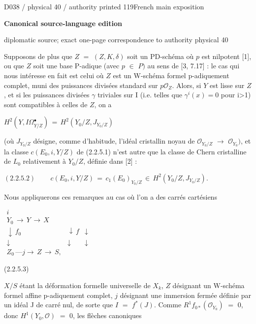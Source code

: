 \documentclass[9pt]{article}
\newcommand{\CanonText}[1]{\par{\fontsize{8.0}{9.35}\selectfont\RaggedRight #1\par}\vspace{2.2pt}}
\newcommand{\CanonDisplay}[1]{\par\vspace{1.2pt}\begin{center}{\fontsize{7.2}{8.4}\selectfont\(\displaystyle #1\)}\end{center}\vspace{1.2pt}}
\newenvironment{CanonMathBlock}{\par\vspace{1.2pt}\begin{center}\fontsize{6.8}{8.0}\selectfont\(\displaystyle}{\)\end{center}\vspace{1.2pt}}
\newcommand{\LayerTitle}{Canonical source-language edition}
\begin{document}
\noindent\begin{minipage}[t][\dimexpr\textheight-5pt\relax][t]{\textwidth}
{\sffamily\fontsize{7.3}{8.2}\selectfont\color{Quiet} D038 / physical 40 / authority printed 119\hfill French main exposition}
\par{}\vspace{4.5pt}
{\sffamily\fontsize{10.4}{11.6}\selectfont\bfseries\color{Accent} \LayerTitle}
\par{\sffamily\fontsize{6.7}{7.7}\selectfont\color{Quiet} diplomatic source; exact one-page correspondence to authority physical 40}
\vspace{5pt}
\CanonText{Supposons de plus que \(Z\) \(=\) \((Z,K,\delta{})\) soit un PD-schéma où \(p\) est nilpotent [1], ou que \(Z\) soit une base P-adique (avec \(p\) \(\in{}\) \(P)\) au sens de [3, 7.17] : le cas qui nous intéresse en fait est celui où \(Z\) est un W-schéma formel p-adiquement complet, muni des puissances divisées standard sur \(p\mathcal{O}_{Z}\). Alors, si \(Y\) est lisse sur \(Z\), et si les puissances divisées \(\gamma{}\) triviales sur I (i.e. telles que \(\gamma{}^{i}(x)=0\) pour i>1) sont compatibles à celles de \(Z\), on a}
\CanonDisplay{H^{2}(Y,I\Omega{}^{\bullet{}}_{Y/Z})\,=\,H^{2}(Y_{0}/Z,J_{Y_{0}/Z})}
\CanonText{(où \(J_{Y_{0}/Z}\) désigne, comme d'habitude, l'idéal cristallin noyau de \(\mathcal{O}_{Y_{0}/Z}\) \(\to{}\) \(\mathcal{O}_{Y_{0}})\), et la classe \(c(E_{0},i,Y/Z)\) de (2.2.5.1) n'est autre que la classe de Chern cristalline de \(L_{0}\) relativement à \(Y_{0}/Z\), définie dans [2] :}
\CanonDisplay{(2.2.5.2)\qquad\,c(E_{0},i,Y/Z)\,=\,c_{1}(E_{0})_{Y_{0}/Z}\,\in{}\,H^{2}(Y_{0}/Z,J_{Y_{0}/Z}).}
\CanonText{Nous appliquerons ces remarques au cas où l'on a des carrés cartésiens}
\begin{CanonMathBlock}
\begin{array}{ccc}
i & {} & {}\\
Y_{0}\,\longrightarrow{}\,Y\,\longrightarrow{}\,X & {} & {}\\
\downarrow{}\,f_{0} & \downarrow{}\,f & \downarrow{}\\
\downarrow{} & \downarrow{} & \downarrow{}\\
Z_{0}\,\text{---}j\longrightarrow{}\,Z\,\longrightarrow{}\,S, & {} & {}
\end{array}
\end{CanonMathBlock}
\CanonText{(2.2.5.3)}
\CanonText{\(X/S\) étant la déformation formelle universelle de \(X_{k}\), \(Z\) désignant un W-schéma formel affine p-adiquement complet, \(j\) désignant une immersion fermée définie par un idéal J de carré nul, de sorte que \(I\) \(=\) \(f^{*}(J)\). Comme \(R^{1}f_{0*}(\mathcal{O}_{Y_{0}})\) \(=\) 0, donc \(H^{1}(Y_{0},\mathcal{O})\) \(=\) 0, les flèches canoniques}

\end{minipage}
\end{document}
